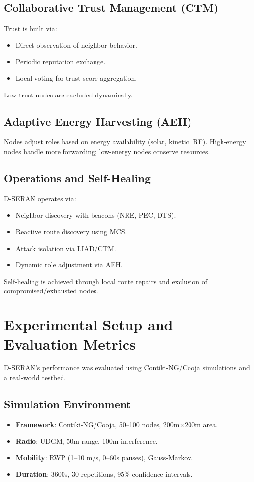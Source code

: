\documentclass[preprint]{elsarticle}
\begin{document}
\subsection{Collaborative Trust Management (CTM)}
Trust is built via:
\begin{itemize}
    \item Direct observation of neighbor behavior.
    \item Periodic reputation exchange.
    \item Local voting for trust score aggregation.
\end{itemize}
Low-trust nodes are excluded dynamically.

\subsection{Adaptive Energy Harvesting (AEH)}
Nodes adjust roles based on energy availability (solar, kinetic, RF). High-energy nodes handle more forwarding; low-energy nodes conserve resources.

\subsection{Operations and Self-Healing}
D-SERAN operates via:
\begin{itemize}
    \item Neighbor discovery with beacons (NRE, PEC, DTS).
    \item Reactive route discovery using MCS.
    \item Attack isolation via LIAD/CTM.
    \item Dynamic role adjustment via AEH.
\end{itemize}
Self-healing is achieved through local route repairs and exclusion of compromised/exhausted nodes.

\section{Experimental Setup and Evaluation Metrics}
\label{sec:setup}

D-SERAN’s performance was evaluated using Contiki-NG/Cooja simulations and a real-world testbed.

\subsection{Simulation Environment}
\begin{itemize}
    \item \textbf{Framework}: Contiki-NG/Cooja, 50–100 nodes, 200m×200m area.
    \item \textbf{Radio}: UDGM, 50m range, 100m interference.
    \item \textbf{Mobility}: RWP (1–10 m/s, 0–60s pauses), Gauss-Markov.
    \item \textbf{Duration}: 3600s, 30 repetitions, 95\% confidence intervals.
\end{itemize}
\end{document}
